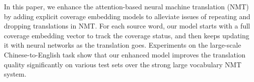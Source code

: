 In this paper, we enhance the attention-based neural machine translation (NMT) by adding explicit coverage embedding models to alleviate issues of repeating and dropping translations in NMT. For each source word, our model starts with a full coverage embedding vector to track the coverage status, and then keeps updating it with neural networks as the translation goes. Experiments on the large-scale Chinese-to-English task show that our enhanced model improves the translation quality significantly on various test sets over the strong large vocabulary NMT system.
